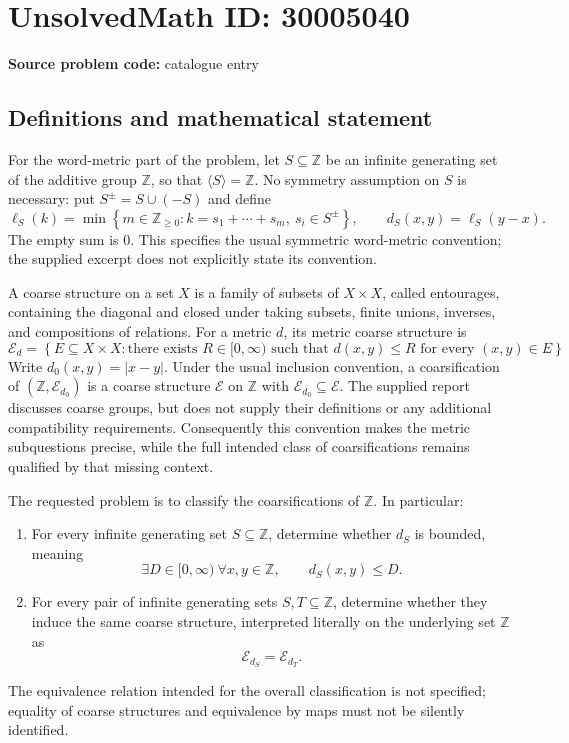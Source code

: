 \documentclass[11pt]{article}
\newcommand{\Z}{\mathbb{Z}}
\begin{document}
\section*{UnsolvedMath ID: 30005040}
\textbf{Source problem code:} catalogue entry
\subsection{Definitions and mathematical statement}
For the word-metric part of the problem, let \(S\subseteq\Z\) be an infinite generating set of the additive group \(\Z\), so that \(\langle S\rangle=\Z\). No symmetry assumption on \(S\) is necessary: put \(S^{\pm}=S\cup(-S)\) and define
\[
\ell_S(k)=\min\left\{m\in\Z_{\geq0}: k=s_1+\cdots+s_m,\ s_i\in S^{\pm}\right\},\qquad d_S(x,y)=\ell_S(y-x).
\]
The empty sum is \(0\). This specifies the usual symmetric word-metric convention; the supplied excerpt does not explicitly state its convention.

A coarse structure on a set \(X\) is a family of subsets of \(X\times X\), called entourages, containing the diagonal and closed under taking subsets, finite unions, inverses, and compositions of relations. For a metric \(d\), its metric coarse structure is
\[
\mathcal E_d=\left\{E\subseteq X\times X:\text{there exists }R\in[0,\infty)\text{ such that }d(x,y)\leq R\text{ for every }(x,y)\in E\right\}.
\]
Write \(d_0(x,y)=|x-y|\). Under the usual inclusion convention, a coarsification of \((\Z,\mathcal E_{d_0})\) is a coarse structure \(\mathcal E\) on \(\Z\) with \(\mathcal E_{d_0}\subseteq\mathcal E\). The supplied report discusses coarse groups, but does not supply their definitions or any additional compatibility requirements. Consequently this convention makes the metric subquestions precise, while the full intended class of coarsifications remains qualified by that missing context.

The requested problem is to classify the coarsifications of \(\Z\). In particular:
\begin{enumerate}
\item For every infinite generating set \(S\subseteq\Z\), determine whether \(d_S\) is bounded, meaning
\[
\exists D\in[0,\infty)\ \forall x,y\in\Z,\qquad d_S(x,y)\leq D.
\]
\item For every pair of infinite generating sets \(S,T\subseteq\Z\), determine whether they induce the same coarse structure, interpreted literally on the underlying set \(\Z\) as
\[
\mathcal E_{d_S}=\mathcal E_{d_T}.
\]
\end{enumerate}
The equivalence relation intended for the overall classification is not specified; equality of coarse structures and equivalence by maps must not be silently identified.
\end{document}
